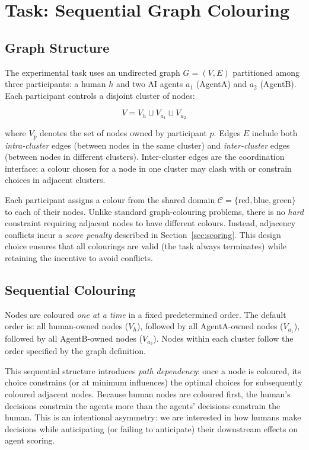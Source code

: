 \documentclass[11pt]{article}
\theoremstyle{definition}
\newcommand{\AgentA}{\textsf{AgentA}}
\newcommand{\AgentB}{\textsf{AgentB}}
\begin{document}
\section{Task: Sequential Graph Colouring}
\label{sec:task}

\subsection{Graph Structure}

The experimental task uses an undirected graph $G = (V, E)$ partitioned among three
participants: a human $h$ and two AI agents $a_1$ (\AgentA) and $a_2$ (\AgentB).  Each
participant controls a disjoint cluster of nodes:

\[
  V = V_h \sqcup V_{a_1} \sqcup V_{a_2}
\]

where $V_p$ denotes the set of nodes owned by participant $p$.  Edges $E$ include
both \emph{intra-cluster} edges (between nodes in the same cluster) and
\emph{inter-cluster} edges (between nodes in different clusters).  Inter-cluster edges
are the coordination interface: a colour chosen for a node in one cluster may clash with
or constrain choices in adjacent clusters.

Each participant assigns a colour from the shared domain $\mathcal{C} = \{\text{red},
\text{blue}, \text{green}\}$ to each of their nodes.  Unlike standard graph-colouring
problems, there is no \emph{hard} constraint requiring adjacent nodes to have different
colours.  Instead, adjacency conflicts incur a \emph{score penalty} described in
Section~\ref{sec:scoring}.  This design choice ensures that all colourings are valid (the
task always terminates) while retaining the incentive to avoid conflicts.

\subsection{Sequential Colouring}
\label{sec:sequential}

Nodes are coloured \emph{one at a time} in a fixed predetermined order.  The default
order is: all human-owned nodes ($V_h$), followed by all \AgentA-owned nodes
($V_{a_1}$), followed by all \AgentB-owned nodes ($V_{a_2}$).  Nodes within each
cluster follow the order specified by the graph definition.

This sequential structure introduces \emph{path dependency}: once a node is coloured,
its choice constrains (or at minimum influences) the optimal choices for subsequently
coloured adjacent nodes.  Because human nodes are coloured first, the human's decisions
constrain the agents more than the agents' decisions constrain the human.  This is an
intentional asymmetry: we are interested in how humans make decisions while anticipating
(or failing to anticipate) their downstream effects on agent scoring.
\end{document}
